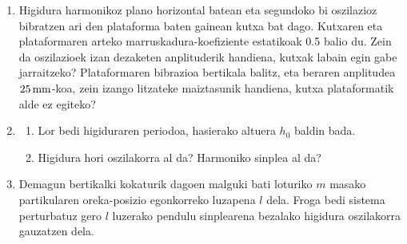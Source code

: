 \documentclass[12pt,twoside]{article}
\begin{document}

\begin{enumerate}

\item 
Higidura harmonikoz plano horizontal batean eta segundoko bi
oszilazioz bibratzen ari den plataforma baten gainean kutxa bat
dago. Kutxaren eta plataformaren arteko marruskadura-koefiziente
estatikoak 0.5 balio du. Zein da oszilazioek izan dezaketen
anplituderik handiena, kutxak labain egin gabe jarraitzeko?
Plataformaren bibrazioa bertikala balitz, eta beraren anplitudea
$25\,{\rm mm}$-koa, zein izango litzateke maiztasunik handiena, kutxa
plataformatik alde ez egiteko?


\item 
{}
\begin{enumerate}
\item Lor bedi higiduraren periodoa, hasierako altuera $h_0$ baldin bada.
\item Higidura hori oszilakorra al da? Harmoniko sinplea al da?
\end{enumerate}

\item 
 Demagun bertikalki kokaturik dagoen malguki bati loturiko $m$ masako
partikularen oreka-posizio egonkorreko luzapena $l$ dela. Froga bedi sistema
perturbatuz gero $l$ luzerako pendulu sinplearena bezalako higidura oszilakorra
gauzatzen dela.



\end{enumerate}
\end{document}
